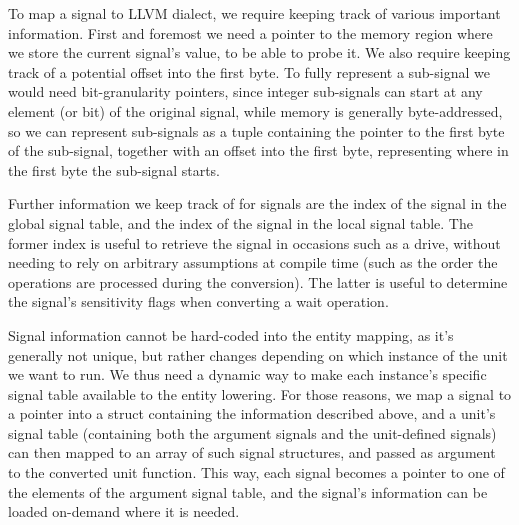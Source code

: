 To map a signal to LLVM dialect, we require keeping track of various important information. First and foremost we need a pointer to the memory region where we store the current signal's value, to be able to probe it. We also require keeping track of a potential offset into the first byte. To fully represent a sub-signal we would need bit-granularity pointers, since integer sub-signals can start at any element (or bit) of the original signal, while memory is generally byte-addressed, so we can represent sub-signals as a tuple containing the pointer to the first byte of the sub-signal, together with an offset into the first byte, representing where in the first byte the sub-signal starts.

Further information we keep track of for signals are the index of the signal in the global signal table, and the index of the signal in the local signal table. The former index is useful to retrieve the signal in occasions such as a drive, without needing to rely on arbitrary assumptions at compile time (such as the order the operations are processed during the conversion). The latter is useful to determine the signal's sensitivity flags when converting a wait operation.

Signal information cannot be hard-coded into the entity mapping, as it's generally not unique, but rather changes depending on which instance of the unit we want to run. We thus need a dynamic way to make each instance's specific signal table available to the entity lowering. For those reasons, we map a signal to a pointer into a struct containing the information described above, and a unit's signal table (containing both the argument signals and the unit-defined signals) can then mapped to an array of such signal structures, and passed as argument to the converted unit function. This way, each signal becomes a pointer to one of the elements of the argument signal table, and the signal's information can be loaded on-demand where it is needed.



